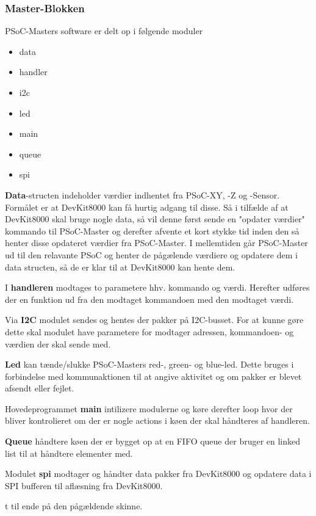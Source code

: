\subsubsection{Master-Blokken}
PSoC-Masters software er delt op i følgende moduler

\begin{itemize}
    \item data
    \item handler
    \item i2c
    \item led
    \item main
    \item queue
    \item spi
\end{itemize}

\textbf{Data}-structen indeholder værdier indhentet fra PSoC-XY, -Z og -Sensor.
Formålet er at DevKit8000 kan få hurtig adgang til disse. Så i tilfælde af at DevKit8000 skal bruge nogle data, så vil denne først sende en "opdater værdier" kommando til PSoC-Master og derefter afvente et kort stykke tid inden den så henter disse opdateret værdier fra PSoC-Master. I mellemtiden går PSoC-Master ud til den relavante PSoC og henter de pågælende værdiere og opdatere dem i data structen, så de er klar til at DevKit8000 kan hente dem.

I \textbf{handleren} modtages to parametere hhv. kommando og værdi.
Herefter udføres der en funktion ud fra den modtaget kommandoen med den modtaget værdi.

Via \textbf{I2C} modulet sendes og hentes der pakker på I2C-busset.
For at kunne gøre dette skal modulet have parametere for modtager adressen, kommandoen- og værdien der skal sende med.

\textbf{Led} kan tænde/slukke PSoC-Masters red-, green- og blue-led. Dette bruges i forbindelse med kommunaktionen til at angive aktivitet og om pakker er blevet afsendt eller fejlet.

Hovedeprogrammet \textbf{main} intilizere modulerne og køre derefter  loop hvor der bliver kontrolieret om der er nogle actions i køen der skal håndteres af handleren.

\textbf{Queue} håndtere køen der er bygget op at en FIFO queue der bruger en linked list til at håndtere elementer med.

Modulet \textbf{spi} modtager og håndter data pakker fra DevKit8000 og opdatere data i SPI bufferen til aflæsning fra DevKit8000.

t til ende på den pågældende skinne.  

